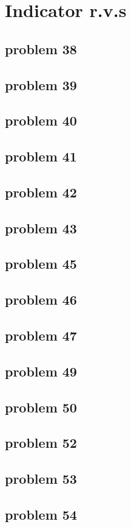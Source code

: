 \section{Indicator r.v.s}

\subsection{problem 38}


\subsection{problem 39}


\subsection{problem 40}


\subsection{problem 41}


\subsection{problem 42}


\subsection{problem 43}


\subsection{problem 45}


\subsection{problem 46}


\subsection{problem 47}


\subsection{problem 49}


\subsection{problem 50}


\subsection{problem 52}


\subsection{problem 53}


\subsection{problem 54}
